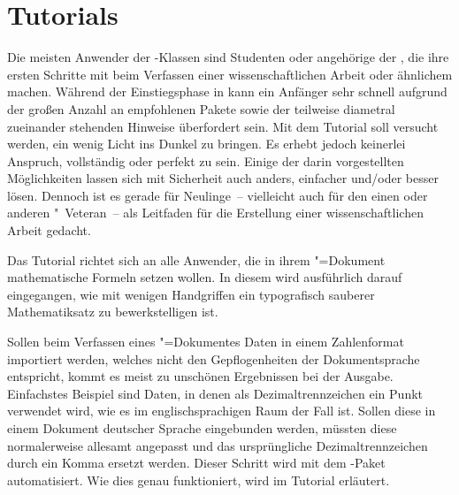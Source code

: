 \chapter{%
  Tutorials%
  \label{sec:tut}%
}
Die meisten Anwender der \TUDScript-Klassen sind Studenten oder angehörige der 
\TnUD, die ihre ersten Schritte mit  beim Verfassen einer 
wissenschaftlichen Arbeit oder ähnlichem machen. Während der Einstiegsphase in 
 kann ein Anfänger sehr schnell aufgrund der großen Anzahl an 
empfohlenen Pakete sowie der teilweise diametral zueinander stehenden Hinweise 
überfordert sein. Mit dem Tutorial  soll versucht 
werden, ein wenig Licht ins Dunkel zu bringen. Es erhebt jedoch keinerlei 
Anspruch, vollständig oder perfekt zu sein. Einige der darin vorgestellten 
Möglichkeiten lassen sich mit Sicherheit auch anders, einfacher und/oder besser 
lösen. Dennoch ist es gerade für Neulinge~-- vielleicht auch für den einen oder 
anderen "~Veteran~-- als Leitfaden für die Erstellung einer 
wissenschaftlichen Arbeit gedacht.

Das Tutorial  richtet sich an alle Anwender, die in 
ihrem "=Dokument mathematische Formeln setzen wollen. In diesem 
wird ausführlich darauf eingegangen, wie mit wenigen Handgriffen ein 
typografisch sauberer Mathematiksatz zu bewerkstelligen ist.

Sollen beim Verfassen eines "=Dokumentes Daten in einem 
Zahlenformat importiert werden, welches nicht den Gepflogenheiten der 
Dokumentsprache entspricht, kommt es meist zu unschönen Ergebnissen bei der 
Ausgabe. Einfachstes Beispiel sind Daten, in denen als Dezimaltrennzeichen ein 
Punkt verwendet wird, wie es im englischsprachigen Raum der Fall ist. Sollen 
diese in einem Dokument deutscher Sprache eingebunden werden, müssten diese 
normalerweise allesamt angepasst und das ursprüngliche Dezimaltrennzeichen 
durch ein Komma ersetzt werden. Dieser Schritt wird mit dem \TUDScript-Paket 
 automatisiert. Wie dies genau funktioniert, wird im Tutorial 
 erläutert.%
%
